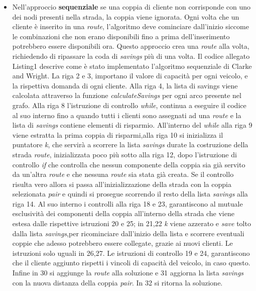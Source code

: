 \documentclass[]{article}
\begin{document}
\begin{itemize}
\item Nell'approccio \textbf{sequenziale} se una coppia di cliente non corrisponde con uno dei nodi presenti nella strada, la coppia viene ignorata.
Ogni volta che un cliente è inserito in una \emph{route}, l'algoritmo deve cominciare dall'inizio siccome le combinazioni che non erano disponibili fino a prima dell'inserimento potrebbero essere disponibili ora. Questo approccio crea una \emph{route} alla volta, richiedendo di ripassare la coda di \emph{savings} più di una volta.
Il codice allegato Listing1 descrive come è stato implementato l'algoritmo sequenziale di Clarke and Wright.
La riga 2 e 3, importano il valore di capacità per ogni veicolo, e la rispettiva domanda di ogni cliente. Alla riga 4, la lista di savings viene calcolata attraverso la funzione \emph{calculateSavings} per ogni arco presente nel grafo. Alla riga 8 l'istruzione di controllo \emph{while}, continua a eseguire il codice al suo interno fino a quando tutti i clienti sono assegnati ad una \emph{route} e la lista di  \emph{savings} contiene elementi di risparmio. All'interno del \emph{while} alla riga 9 viene estratta la prima coppia di risparmi,alla riga 10 si inizializza il puntatore \emph{k}, che servirà a scorrere la lista \emph{savings} durate la costruzione della strada \emph{route}, inizializzata poco più sotto alla riga 12, dopo l'istruzione di controllo \emph{if} che controlla che nessun componente della coppia sia già servito da un'altra \emph{route} e che nessuna \emph{route} sia stata già creata. Se il controllo risulta vero allora si passa all'inizializzazione della strada con la coppia selezionata \emph{pair} e quindi si prosegue scorrendo il resto della lista \emph{savings} alla riga 14. Al suo interno i controlli alla riga 18 e 23, garantiscono al mutuale esclusività dei componenti della coppia all'interno della strada che viene estesa dalle rispettive istruzioni 20 e 25; in 21,22 \emph{k} viene azzerato e \emph{save} tolto dalla lista \emph{savings},per ricominciare dall'inizio della lista e scorrere eventuali coppie che adesso potrebbero essere collegate, grazie ai nuovi clienti. Le istruzioni solo uguali in 26,27. Le istruzioni di controllo 19 e 24, garantiscono che il cliente aggiunto rispetti i vincoli di capacità del veicolo, in caso questo.  Infine in 30 si aggiunge la \emph{route} alla soluzione e 31 aggiorna la lista \emph{savings} con la nuova distanza della coppia \emph{pair}. In 32 si ritorna la soluzione.


\end{itemize}
\end{document}
